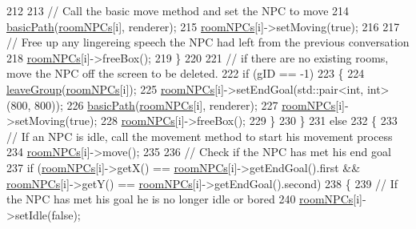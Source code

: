 \begin{DoxyCode}
212 
213                     \textcolor{comment}{// Call the basic move method and set the NPC to move}
214                     \hyperlink{class_room_af25611552daa6c57915a0b0c98c40a8a}{basicPath}(\hyperlink{class_room_a34bdf24cc8c52d638bcfd851c295f23b}{roomNPCs}[i], renderer);
215                     \hyperlink{class_room_a34bdf24cc8c52d638bcfd851c295f23b}{roomNPCs}[i]->setMoving(\textcolor{keyword}{true});
216 
217                     \textcolor{comment}{// Free up any lingereing speech the NPC had left from the previous conversation}
218                     \hyperlink{class_room_a34bdf24cc8c52d638bcfd851c295f23b}{roomNPCs}[i]->freeBox();
219                 \}
220 
221                 \textcolor{comment}{// if there are no existing rooms, move the NPC off the screen to be deleted.}
222                 \textcolor{keywordflow}{if} (gID == -1)
223                 \{
224                     \hyperlink{class_room_af6bdbbf116aeafe290a31990a1124562}{leaveGroup}(\hyperlink{class_room_a34bdf24cc8c52d638bcfd851c295f23b}{roomNPCs}[i]);
225                     \hyperlink{class_room_a34bdf24cc8c52d638bcfd851c295f23b}{roomNPCs}[i]->setEndGoal(std::pair<int, int>(800, 800));
226                     \hyperlink{class_room_af25611552daa6c57915a0b0c98c40a8a}{basicPath}(\hyperlink{class_room_a34bdf24cc8c52d638bcfd851c295f23b}{roomNPCs}[i], renderer);
227                     \hyperlink{class_room_a34bdf24cc8c52d638bcfd851c295f23b}{roomNPCs}[i]->setMoving(\textcolor{keyword}{true});
228                     \hyperlink{class_room_a34bdf24cc8c52d638bcfd851c295f23b}{roomNPCs}[i]->freeBox();
229                 \}
230             \}
231             \textcolor{keywordflow}{else}
232             \{
233                 \textcolor{comment}{// If an NPC is idle, call the movement method to start his movement process}
234                 \hyperlink{class_room_a34bdf24cc8c52d638bcfd851c295f23b}{roomNPCs}[i]->move();
235 
236                 \textcolor{comment}{// Check if the NPC has met his end goal}
237                 \textcolor{keywordflow}{if} (\hyperlink{class_room_a34bdf24cc8c52d638bcfd851c295f23b}{roomNPCs}[i]->getX() == \hyperlink{class_room_a34bdf24cc8c52d638bcfd851c295f23b}{roomNPCs}[i]->getEndGoal().first && 
      \hyperlink{class_room_a34bdf24cc8c52d638bcfd851c295f23b}{roomNPCs}[i]->getY() == \hyperlink{class_room_a34bdf24cc8c52d638bcfd851c295f23b}{roomNPCs}[i]->getEndGoal().second)
238                 \{
239                     \textcolor{comment}{// If the NPC has met his goal he is no longer idle or bored}
240                     \hyperlink{class_room_a34bdf24cc8c52d638bcfd851c295f23b}{roomNPCs}[i]->setIdle(\textcolor{keyword}{false});

\end{DoxyCode}
